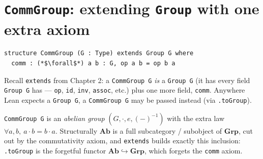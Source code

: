 \section{\texorpdfstring{\texttt{CommGroup}: extending \texttt{Group} with one extra axiom}{CommGroup: extending Group with one extra axiom}}\label{sec:08-rings:02-comm-group:1}

\begin{lstlisting}
structure CommGroup (G : Type) extends Group G where
  comm : (*$\forall$*) a b : G, op a b = op b a
\end{lstlisting}

Recall \texttt{extends} from Chapter 2: a \texttt{CommGroup G} \emph{is} a \texttt{Group G} (it has every field \texttt{Group G} has --- \texttt{op}, \texttt{id}, \texttt{inv}, \texttt{assoc}, etc.) plus one more field, \texttt{comm}. Anywhere Lean expects a \texttt{Group G}, a \texttt{CommGroup G} may be passed instead (via \texttt{.toGroup}).

\begin{mathreading}

\texttt{CommGroup G} is an \emph{abelian group} \((G, \cdot, e,
(-)^{-1})\) with the extra law \(\forall a,b,\ a\cdot b = b\cdot a\). Structurally \(\mathbf{Ab}\) is a full subcategory / subobject of \(\mathbf{Grp}\), cut out by the commutativity axiom, and \texttt{extends} builds exactly this inclusion: \texttt{.toGroup} is the forgetful functor \(\mathbf{Ab} \hookrightarrow \mathbf{Grp}\), which forgets the \texttt{comm} axiom.

\end{mathreading}
